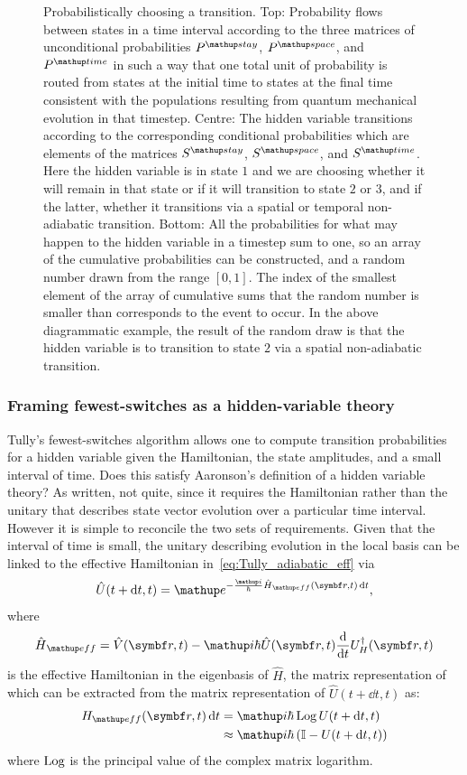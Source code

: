 \begin{figure}[t]
    \caption{Probabilistically choosing a transition. Top: Probability flows between states in a time interval according to the three matrices of unconditional probabilities $P^\up{stay}$, $P^\up{space}$, and $P^\up{time}$ in such a way that one total unit of probability is routed from states at the initial time to states at the final time consistent with the populations resulting from quantum mechanical evolution in that timestep. Centre: The hidden variable transitions according to the corresponding conditional probabilities which are elements of the matrices $S^\up{stay}$, $S^\up{space}$, and $S^\up{time}$. Here the hidden variable is in state $1$ and we are choosing whether it will remain in that state or if it will transition to state $2$ or $3$, and if the latter, whether it transitions via a spatial or temporal non-adiabatic transition. Bottom: All the probabilities for what may happen to the hidden variable in a timestep sum to one, so an array of the cumulative probabilities can be constructed, and a random number drawn from the range $[0,1]$. The index of the smallest element of the array of cumulative sums that the random number is smaller than corresponds to the event to occur. In the above diagrammatic example, the result of the random draw is that the hidden variable is to transition to state $2$ via a spatial non-adiabatic transition.}\label{fig:random_choice}
\end{figure}

\subsubsection{Framing fewest-switches as a hidden-variable theory}

Tully's fewest-switches algorithm allows one to compute transition probabilities for a hidden variable given the Hamiltonian, the state amplitudes, and a small interval of time. Does this satisfy Aaronson's definition of a hidden variable theory? As written, not quite, since it requires the Hamiltonian rather than the unitary that describes state vector evolution over a particular time interval. However it is simple to reconcile the two sets of requirements. Given that the interval of time is small, the unitary describing evolution in the local basis can be linked to the effective Hamiltonian in~\eqref{eq:Tully_adiabatic_eff} via
\begin{align}
\hat U(t+\dd t, t) = \ee^{-\frac\ii\hbar\hat H_\up{eff}(\vec r, t)\,\dd t},
\end{align}
where
\begin{align}
\hat H_\up{eff} = \hat V(\vec r, t)
  - \ii\hbar\hat U(\vec r, t)\dv{t}U^\dagger_H(\vec r, t)
\end{align}
is the effective Hamiltonian in the eigenbasis of $\hat H$, the matrix representation of which can be extracted from the matrix representation of $\hat U(t+\dd t, t)$ as:
\begin{align}
H_\up{eff}(\vec r, t)\,\dd t &= \ii\hbar\Log U(t+\dd t, t)\\
&\approx \ii\hbar\left(\mathbb{I} -  U(t+\dd t, t)\right)
\end{align}
where $\operatorname{Log}$ is the principal value of the complex matrix logarithm.

